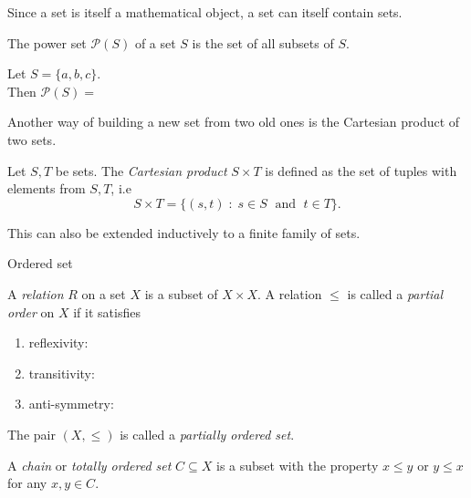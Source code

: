\documentclass [aspectratio=169, handout]{beamer}
\newcommand{\cP}{\mathcal{P}}
\begin{document}
\begin{frame}
Since a set is itself a mathematical object, a set can itself contain sets.
\begin{definition}
The power set $\cP(S)$ of a set $S$ is the set of all subsets of $S$.
\end{definition}

\vspace{2em}

\begin{example}
Let $S = \{a,b,c\}$.  \\
Then $\cP(S) = $ 
\vspace{1em}
\end{example}
\end{frame}

\begin{frame}
Another way of building a new set from two old ones is the Cartesian product of two sets.

\begin{definition}\label{def:cartes_prod}
Let $S,T$ be sets. The \emph{Cartesian product} $S\times T$ is defined as the set of tuples with elements from $S,T$, i.e 
\begin{equation*}
    S\times T = \{ (s,t) \; \colon \; s \in S \; \text{ and } \; t \in T\}.
\end{equation*}
\end{definition}
\vspace{1em}

This can also be extended inductively to a finite family of sets. 

\end{frame}

\begin{frame}{Ordered set}
\begin{definition}
A \emph{relation} $R$ on a set $X$ is a subset of $X \times X$. A relation $\leq$ is called a \emph{partial order} on $X$ if it satisfies
\begin{enumerate}
\item reflexivity: 
\item transitivity: 
\item anti-symmetry: 
\end{enumerate}
The pair $(X, \leq)$ is called a \emph{partially ordered set}.

\vspace{1em}

A \emph{chain} or \emph{totally ordered set} $C \subseteq X$ is a subset with the property $x \leq y$ or $y \leq x$ for any $x,y \in C$.
\end{definition}

\end{frame}
\end{document}
